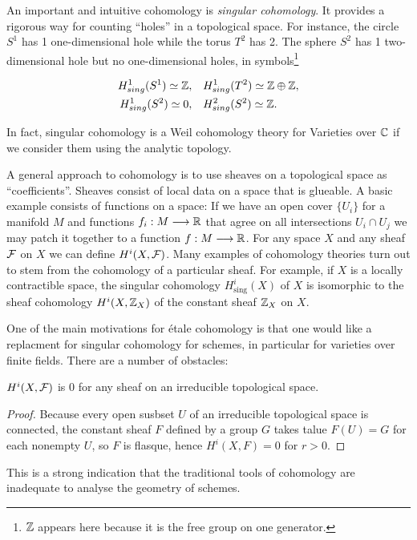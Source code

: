 An important and intuitive cohomology is \textit{singular cohomology}. It provides a rigorous way for counting ``holes'' in a topological space. For instance, the circle $S^1$ has 1 one-dimensional hole while the torus $T^2$ has 2. The sphere $S^2$ has 1 two-dimensional hole but no one-dimensional holes, in symbols\footnote{$\mathbb{Z}$ appears here because it is the free group on one generator.}

\begin{align*}
	H^1_{sing}(S^1) \simeq \mathbb{Z},\quad & H^1_{sing}(T^2) \simeq \mathbb{Z} \oplus \mathbb{Z}, \\
	H^1_{sing}(S^2) \simeq  0,\quad & H^2_{sing}(S^2) \simeq \mathbb{Z}.
\end{align*}

In fact, singular cohomology is a Weil cohomology theory for Varieties over $\mathbb{C}$ if we consider them using the analytic topology.

A general approach to cohomology is to use sheaves on a topological space as ``coefficients''. Sheaves consist of local data on a space that is glueable. A basic example consists of functions on a space: If we have an open cover $\{ U_i\}$ for a manifold $M$ and functions $f_i: M \longrightarrow \mathbb{R}$ that agree on all intersections $U_i \cap U_j$ we may patch it together to a function $f: M \longrightarrow \mathbb{R}$.
For any space $X$ and any sheaf $\mathcal{F}$ on $X$ we can define $H^i(X, \mathcal{F})$. Many examples of cohomology theories turn out to stem from the cohomology of a particular sheaf. For example, if $X$ is a locally contractible space, the singular cohomology $H_{\text{sing}}^i(X)$ of $X$ is isomorphic to the sheaf cohomology $H^i(X, \mathbb{Z}_X)$ of the constant sheaf $\mathbb{Z}_X$ on $X$.

One of the main motivations for \'etale cohomology is that one would like a replacment for singular cohomology for schemes, in particular for varieties over finite fields. There are a number of obstacles:

\begin{proposition}
	$H^i(X, \mathcal{F})$ is 0 for any sheaf on an irreducible topological space.
\end{proposition}

\begin{proof}
	Because every open susbset $U$ of an irreducible topological space is connected, the constant sheaf $F$ defined by a group $G$ takes talue $F(U) = G$ for each nonempty $U$, so $F$ is flasque, hence $H^i(X,F) = 0$ for $r>0$.
\end{proof}

This is a strong indication that the traditional tools of cohomology are inadequate to analyse the geometry of schemes.




